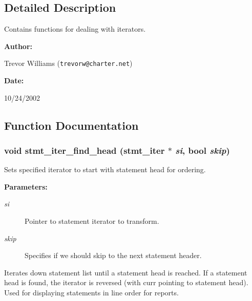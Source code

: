 \subsection{Detailed Description}
Contains functions for dealing with iterators.



\begin{Desc}
\item[{\bf Author: }]\par
Trevor Williams ({\tt trevorw@charter.net}) \end{Desc}
\begin{Desc}
\item[{\bf Date: }]\par
10/24/2002

\end{Desc}


\subsection{Function Documentation}
\subsubsection{\setlength{\rightskip}{0pt plus 5cm}void stmt\_\-iter\_\-find\_\-head ({\bf stmt\_\-iter} $\ast$ {\em si}, {\bf bool} {\em skip})}\label{iter_8h_a3}


Sets specified iterator to start with statement head for ordering.

\begin{Desc}
\item[{\bf Parameters: }]\par
\begin{description}
\item[
{\em si}]Pointer to statement iterator to transform. \item[
{\em skip}]Specifies if we should skip to the next statement header.

\end{description}
\end{Desc}
Iterates down statement list until a statement head is reached. If a statement head is found, the iterator is reversed (with curr pointing to statement head). Used for displaying statements in line order for reports. 
